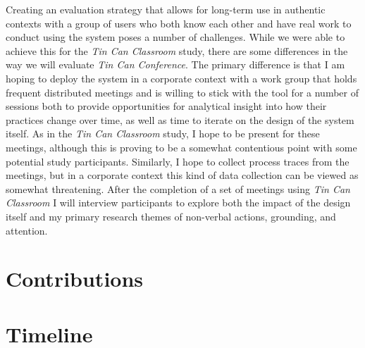 \documentclass{tufte-handout}
\begin{document}
Creating an evaluation strategy that allows for long-term use in authentic contexts with a group of users who both know each other and have real work to conduct using the system poses a number of challenges. While we were able to achieve this for the \emph{Tin Can Classroom} study, there are some differences in the way we will evaluate \emph{Tin Can Conference}. The primary difference is that I am hoping to deploy the system in a corporate context with a work group that holds frequent distributed meetings and is willing to stick with the tool for a number of sessions both to provide opportunities for analytical insight into how their practices change over time, as well as time to iterate on the design of the system itself. As in the \emph{Tin Can Classroom} study, I hope to be present for these meetings, although this is proving to be a somewhat contentious point with some potential study participants. Similarly, I hope to collect process traces from the meetings, but in a corporate context this kind of data collection can be viewed as somewhat threatening. After the completion of a set of meetings using \emph{Tin Can Classroom} I will interview participants to explore both the impact of the design itself and my primary research themes of non-verbal actions, grounding, and attention.



\section{Contributions}

\section{Timeline}





\end{document}
